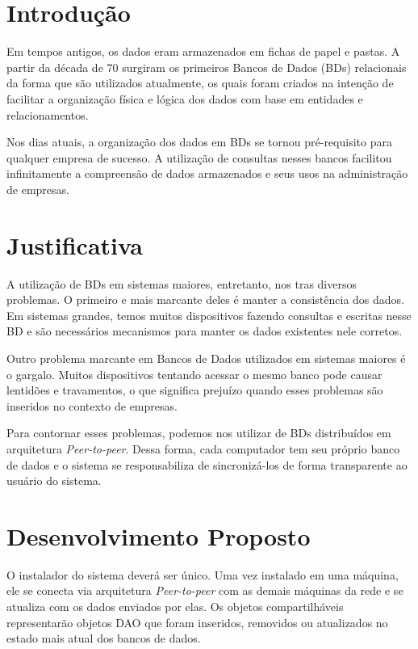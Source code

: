 \documentclass{article}
\begin{document}
\section*{Introdução}

Em tempos antigos, os dados eram armazenados em fichas de papel e pastas. A partir da década de 70 surgiram os primeiros Bancos de Dados (BDs) relacionais da forma que são utilizados atualmente, os quais foram criados na intenção de facilitar a organização física e lógica dos dados com base em entidades e relacionamentos. 

Nos dias atuais, a organização dos dados em BDs se tornou pré-requisito para qualquer empresa de sucesso. A utilização de consultas nesses bancos facilitou infinitamente a compreensão de dados armazenados e seus usos na administração de empresas.

\section*{Justificativa}

A utilização de BDs em sistemas maiores, entretanto, nos tras diversos problemas. O primeiro e mais marcante deles é manter a consistência dos dados. Em sistemas grandes, temos muitos dispositivos fazendo consultas e escritas nesse BD e são necessários mecanismos para manter os dados existentes nele corretos.


Outro problema marcante em Bancos de Dados utilizados em sistemas maiores é o gargalo. Muitos dispositivos tentando acessar o mesmo banco pode causar lentidões e travamentos, o que significa prejuízo quando esses problemas são inseridos no contexto de empresas.

Para contornar esses problemas, podemos nos utilizar de BDs distribuídos em arquitetura \emph{Peer-to-peer}. Dessa forma, cada computador tem seu próprio banco de dados e o sistema se responsabiliza de sincronizá-los de forma transparente ao usuário do sistema.


\section*{Desenvolvimento Proposto}

O instalador do sistema deverá ser único. Uma vez instalado em uma máquina, ele se conecta via arquitetura \emph{Peer-to-peer} com as demais máquinas da rede e se atualiza com os dados enviados por elas. Os objetos compartilháveis representarão objetos DAO que foram inseridos, removidos ou atualizados no estado mais atual dos bancos de dados.
\end{document}

